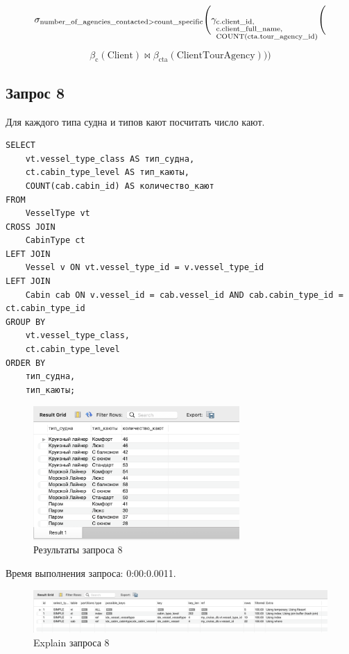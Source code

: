 \documentclass[11pt,a4paper,final]{article}
\begin{document}
$$
\sigma_{\text{number\_of\_agencies\_contacted} > \text{count\_specific}} \Bigg(
\gamma_{\begin{subarray}{l}
\text{c.client\_id}, \\
\text{c.client\_full\_name}, \\
\text{COUNT(cta.tour\_agency\_id)}
\end{subarray}} \Bigg(
$$

$$
\beta_{\text{c}}(\text{Client}) \bowtie \beta_{\text{cta}}(\text{ClientTourAgency}) \Bigg)\Bigg)
$$


\subsection{Запрос 8}
Для каждого типа судна и типов кают посчитать число кают.
\begin{lstlisting}[style=sqlstyle, label=sql:query1]
SELECT
    vt.vessel_type_class AS тип_судна,
    ct.cabin_type_level AS тип_каюты,
    COUNT(cab.cabin_id) AS количество_кают
FROM
    VesselType vt
CROSS JOIN 
    CabinType ct
LEFT JOIN
    Vessel v ON vt.vessel_type_id = v.vessel_type_id 
LEFT JOIN
    Cabin cab ON v.vessel_id = cab.vessel_id AND cab.cabin_type_id = ct.cabin_type_id 
GROUP BY
    vt.vessel_type_class,
    ct.cabin_type_level
ORDER BY
    тип_судна,
    тип_каюты;
\end{lstlisting}
\begin{figure}[h!]
    \centering
    \includegraphics[width=0.7\textwidth]{26.png} 
    \caption{Результаты запроса 8}
\end{figure}
{\centering
Время выполнения запроса: 0:00:0.0011.\par}
\begin{figure}[H]
    \centering
    \includegraphics[width=\textwidth]{27.png} 
    \caption{Explain запроса 8}
\end{figure}
\end{document}

